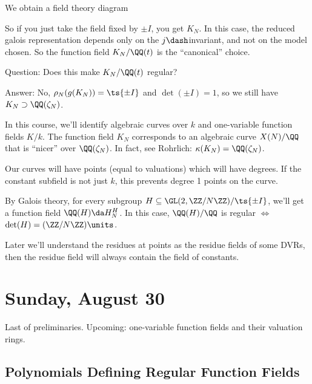 We obtain a field theory diagram

\begin{center}
\end{center}

So if you just take the field fixed by \(\pm I\), you get \(K_N\). In
this case, the reduced galois representation depends only on the
\(j\dash\)invariant, and not on the model chosen. So the function field
\(K_N/\QQ(t)\) is the ``canonical'' choice.

Question: Does this make \(K_N/\QQ(t)\) regular?

Answer: No, \(\rho_N(g(K_N)) = \ts{\pm I}\) and \(\det(\pm I) = 1\), so
we still have \(K_N \supset \QQ(\zeta_N)\).

In this course, we'll identify algebraic curves over \(k\) and
one-variable function fields \(K/k\). The function field \(K_N\)
corresponds to an algebraic curve \(X(N)/\QQ\) that is ``nicer'' over
\(\QQ(\zeta_N)\). In fact, see Rohrlich: \(\kappa(K_N) = \QQ(\zeta_N)\).

Our curves will have points (equal to valuations) which will have
degrees. If the constant subfield is not just \(k\), this prevents
degree 1 points on the curve.

By Galois theory, for every subgroup
\(H \subseteq \GL(2, \ZZ/N\ZZ) / \ts{\pm I}\), we'll get a function
field \(\QQ(H) \da H_N^H\). In this case, \(\QQ(H)/\QQ\) is regular
\(\iff\) \(\det(H) = (\ZZ/N\ZZ)\units\).

Later we'll understand the residues at points as the residue fields of
some DVRs, then the residue field will always contain the field of
constants.

\hypertarget{sunday-august-30-1}{%
\section{Sunday, August 30}\label{sunday-august-30-1}}

Last of preliminaries. Upcoming: one-variable function fields and their
valuation rings.

\hypertarget{polynomials-defining-regular-function-fields}{%
\subsection{Polynomials Defining Regular Function
Fields}\label{polynomials-defining-regular-function-fields}}


